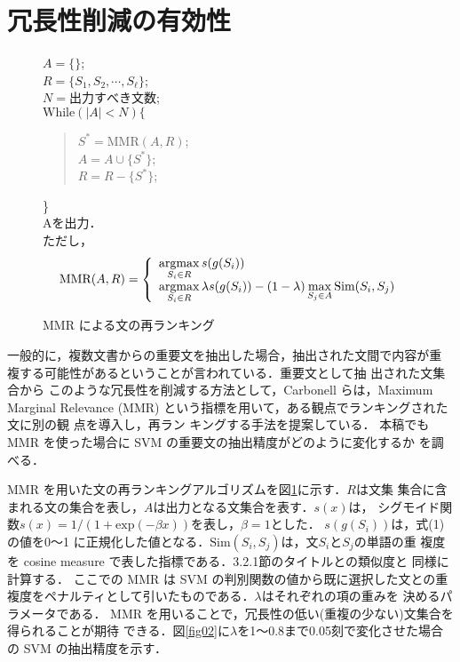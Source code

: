 \section{冗長性削減の有効性}

\begin{figure}[tb]
 \begin{center}
  \begin{minipage}{.75\linewidth}
   \begin{screen}
   $A = \{\}$;\\
   $R = \{S_1,S_2,\cdots,S_\ell\}$;\\
   $N = 出力すべき文数$;\\
   $\mbox{While}(|A| < N)\{$
   \begin{quote}
    $S^* = \mbox{MMR}(A,R)$;\\
    $A = A \cup \{S^*\}$;\\
    $R = R - \{S^*\}$;
   \end{quote}
   \}\\
   Aを出力．\\
  ただし，\noindent
   \[
   \mbox{MMR}(A,R) =
   \left\{ \begin{array}{ll}
   \displaystyle
    \mathop{\rm argmax}_{S_i \in R} s(g(S_i))\\
   \displaystyle
    \mathop{\rm argmax}_{S_i \in R} \lambda s(g(S_i)) - (1- \lambda)\mathop{\rm max}_{S_j \in A}\mbox{Sim}(S_i,S_j)\\
	   \end{array} \right.
   \]
   \end{screen}
  \end{minipage}
 \end{center}
   \caption{MMR による文の再ランキング}
   \label{fig01}
\end{figure}

一般的に，複数文書からの重要文を抽出した場合，抽出された文間で内容が重
複する可能性があるということが言われている\cite{article8}．重要文として抽
出された文集合から
このような冗長性を削減する方法として，Carbonell らは，Maximum Marginal
Relevance (MMR) という指標を用いて，ある観点でランキングされた文に別の観
点を導入し，再ラン
キングする手法を提案している\cite{article48}．
本稿でも MMR を使った場合に SVM の重要文の抽出精度がどのように変化するか
を調べる．

MMR を用いた文の再ランキングアルゴリズムを図\ref{fig01}に示す．$R$は文集
集合に含まれる文の集合を表し，$A$は出力となる文集合を表す．$s(x)$は，
シグモイド関数$s(x)= 1/(1+\mbox{exp}(-\beta x))$を表し，$\beta=1$とした．
$s(g(S_i))$は，式(1)の値を0〜1
に正規化した値となる．$\mbox{Sim}(S_i,S_j)$は，文$S_i$と$S_j$の単語の重
複度を cosine measure で表した指標である．3.2.1節のタイトルとの類似度と
同様に計算する．
ここでの MMR は SVM の判別関数の値から既に選択した文との重
複度をペナルティとして引いたものである．$\lambda$はそれぞれの項の重みを
決めるパラメータである．
MMR を用いることで，冗長性の低い(重複の少ない)文集合を得られることが期待
できる．図\ref{fig02}に$\lambda$を1〜0.8まで0.05刻で変化させた場合の SVM
の抽出精度を示す．

